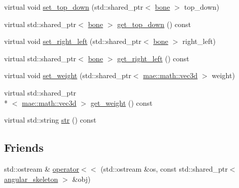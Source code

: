 \begin{DoxyCompactItemize}
virtual void \hyperlink{classmae_1_1fl_1_1angular__skeleton_ac869c6b0a431f2f3810d319e47986069}{set\-\_\-top\-\_\-down} (std\-::shared\-\_\-ptr$<$ \hyperlink{classmae_1_1bone}{bone} $>$ top\-\_\-down)
\item 
virtual std\-::shared\-\_\-ptr$<$ \hyperlink{classmae_1_1bone}{bone} $>$ \hyperlink{classmae_1_1fl_1_1angular__skeleton_a138779503a2ab02bad8d15705adf3203}{get\-\_\-top\-\_\-down} () const 
\item 
virtual void \hyperlink{classmae_1_1fl_1_1angular__skeleton_a13eb821e9c93c218e4d34a9c02960ebc}{set\-\_\-right\-\_\-left} (std\-::shared\-\_\-ptr$<$ \hyperlink{classmae_1_1bone}{bone} $>$ right\-\_\-left)
\item 
virtual std\-::shared\-\_\-ptr$<$ \hyperlink{classmae_1_1bone}{bone} $>$ \hyperlink{classmae_1_1fl_1_1angular__skeleton_ae91ef0dd87f4ed99c144fbcfadc59559}{get\-\_\-right\-\_\-left} () const 
\item 
virtual void \hyperlink{classmae_1_1fl_1_1angular__skeleton_a682bb661d0451ada678a49d5bfbab72e}{set\-\_\-weight} (std\-::shared\-\_\-ptr$<$ \hyperlink{classmae_1_1math_1_1vec3d}{mae\-::math\-::vec3d} $>$ weight)
\item 
virtual std\-::shared\-\_\-ptr\\*
$<$ \hyperlink{classmae_1_1math_1_1vec3d}{mae\-::math\-::vec3d} $>$ \hyperlink{classmae_1_1fl_1_1angular__skeleton_a07633f191e91165035aeaacfcb553130}{get\-\_\-weight} () const 
\item 
virtual std\-::string \hyperlink{classmae_1_1fl_1_1angular__skeleton_a786a62157d68c11a223ab22755a6d326}{str} () const 
\end{DoxyCompactItemize}
\subsection*{Friends}
\begin{DoxyCompactItemize}
\item 
std\-::ostream \& \hyperlink{classmae_1_1fl_1_1angular__skeleton_a34e41467f6fcab05252e8e28b2cbdd3e}{operator$<$$<$} (std\-::ostream \&os, const std\-::shared\-\_\-ptr$<$ \hyperlink{classmae_1_1fl_1_1angular__skeleton}{angular\-\_\-skeleton} $>$ \&obj)
\end{DoxyCompactItemize}


